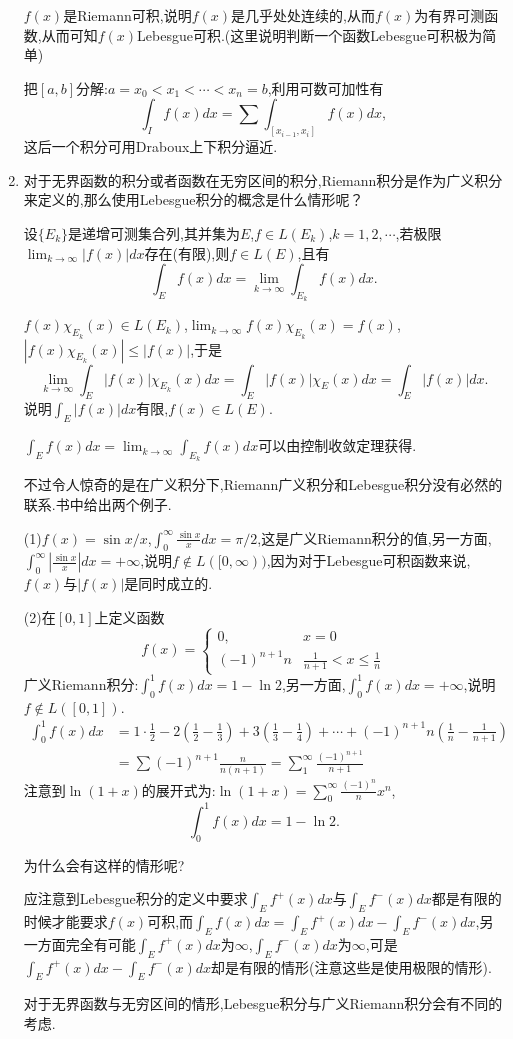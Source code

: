 \documentclass[12pt,a4paper,openany]{book}
\begin{document}
\begin{enumerate}
$f(x)$是Riemann可积,说明$f(x)$是几乎处处连续的,从而$f(x)$为有界可测函数,从而可知$f(x)$Lebesgue可积.(这里说明判断一个函数Lebesgue可积极为简单)

把$[a,b]$分解:$a=x_0<x_1<\cdots<x_n=b$,利用可数可加性有
\[
\int_{I}{f(x)dx} = \sum{\int_{[x_{i-1}, x_i]}{f(x)dx}},
\]
这后一个积分可用Draboux上下积分逼近.

\item 对于无界函数的积分或者函数在无穷区间的积分,Riemann积分是作为广义积分来定义的,那么使用Lebesgue积分的概念是什么情形呢？

设$\{E_k\}$是递增可测集合列,其并集为$E$,$f \in L(E_k)$,$k=1,2,\cdots$,若极限$\lim_{k \rightarrow \infty}{|f(x)|dx}$存在(有限),则$f \in L(E)$,且有
\[
\int_{E}{f(x)dx} = \lim_{k \rightarrow \infty}{\int_{E_k}{f(x)dx}}.
\]

$f(x)\chi_{E_k}(x) \in L(E_k)$,$\lim_{k \rightarrow \infty}{f(x)\chi_{E_k}(x)} = f(x)$,$|f(x)\chi_{E_k}(x)| \le |f(x)|$,于是
\[
\lim_{k \rightarrow \infty}{\int_{E}{|f(x)|\chi_{E_k}(x)dx}} = \int_{E}{|f(x)|\chi_{E}(x)dx}=\int_{E}{|f(x)|dx}.
\]
说明$\int_{E}{|f(x)|dx}$有限,$f(x) \in L(E)$.

$\int_{E}{f(x)dx} = \lim_{k \rightarrow \infty}{\int_{E_k}{f(x)dx}}$可以由控制收敛定理获得.

不过令人惊奇的是在广义积分下,Riemann广义积分和Lebesgue积分没有必然的联系.书中给出两个例子.

(1)$f(x)=\sin{x}/x$,$\int_{0}^{\infty}{\frac{\sin{x}}{x}dx} = \pi/2$,这是广义Riemann积分的值,另一方面,$\int_{0}^{\infty}{|\frac{\sin{x}}{x}|dx} = +\infty$,说明$f \notin L([0, \infty))$,因为对于Lebesgue可积函数来说,$f(x)$与$|f(x)|$是同时成立的.

(2)在$[0,1]$上定义函数
\[
f(x) = \begin{cases}
0, & x=0 \\
(-1)^{n+1}n & \frac{1}{n+1} < x \le \frac{1}{n}
\end{cases}
\]
广义Riemann积分:$\int_{0}^{1}{f(x)dx} = 1 - \ln{2}$,另一方面,$\int_{0}^{1}{f(x)dx} = +\infty$,说明$f \notin L([0,1])$.
\[
\begin{aligned}
\int_{0}^{1}{f(x)dx} &=1 \cdot \frac{1}{2} - 2(\frac{1}{2} - \frac{1}{3}) + 3(\frac{1}{3} - \frac{1}{4}) + \cdots + (-1)^{n+1}n(\frac{1}{n} - \frac{1}{n+1}) \\
&=\sum{(-1)^{n+1}\frac{n}{n(n+1)}}=\sum_{1}^{\infty}{\frac{(-1)^{n+1}}{n+1}}
\end{aligned}
\]
注意到$\ln{(1+x)}$的展开式为:$\ln{(1+x)} = \sum_{0}^{\infty}{\frac{(-1)^n}{n}x^n}$,
\[
\int_{0}^{1}{f(x)dx} = 1 - \ln{2}.
\]

为什么会有这样的情形呢?

应注意到Lebesgue积分的定义中要求$\int_{E}{f^+(x)dx}$与$\int_{E}{f^-(x)dx}$都是有限的时候才能要求$f(x)$可积,而$\int_{E}{f(x)dx} = \int_{E}{f^+(x)dx} - \int_{E}{f^-(x)dx}$,另一方面完全有可能$\int_{E}{f^+(x)dx}$为$\infty$,$\int_{E}{f^-(x)dx}$为$\infty$,可是$\int_{E}{f^+(x)dx} - \int_{E}{f^-(x)dx}$却是有限的情形(注意这些是使用极限的情形).

对于无界函数与无穷区间的情形,Lebesgue积分与广义Riemann积分会有不同的考虑.

\end{enumerate}
\end{document}
